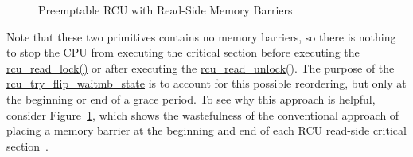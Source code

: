 \begin{figure}[htb]
\begin{center}
\end{center}
\caption{Preemptable RCU with Read-Side Memory Barriers}
\label{app:rcuimpl:Preemptable RCU with Read-Side Memory Barriers}
\end{figure}

Note that these two primitives contains no memory barriers, so there is
nothing to stop the CPU from executing the critical section
before executing the \url{rcu_read_lock()} or after executing
the \url{rcu_read_unlock()}.
The purpose of the \url{rcu_try_flip_waitmb_state} is to
account for this possible reordering, but only at the beginning or end of
a grace period.
To see why this approach is helpful, consider
Figure~\ref{app:rcuimpl:Preemptable RCU with Read-Side Memory Barriers},
which shows the wastefulness of the conventional approach of placing
a memory barrier at the beginning and end of each RCU read-side critical
section~\cite{PaulEMcKenney2006b}.

